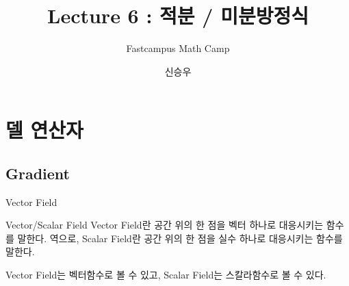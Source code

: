 \documentclass{beamer}
\title{Lecture 6 : 적분 / 미분방정식 }
\subtitle{Fastcampus Math Camp}
\author{신승우}
\begin{document}
\begin{frame}
 \titlepage
\end{frame}





\section{델 연산자} 

\subsection{Gradient} 

\begin{frame}{Vector Field} 
\begin{block}{Vector/Scalar Field} 
Vector Field란 공간 위의 한 점을 벡터 하나로 대응시키는 함수를 말한다. 역으로, Scalar Field란 공간 위의 한 점을 실수 하나로 대응시키는 함수를 말한다. 
\end{block}

Vector Field는 벡터함수로 볼 수 있고, Scalar Field는 스칼라함수로 볼 수 있다. 

\end{frame}
\end{document}
